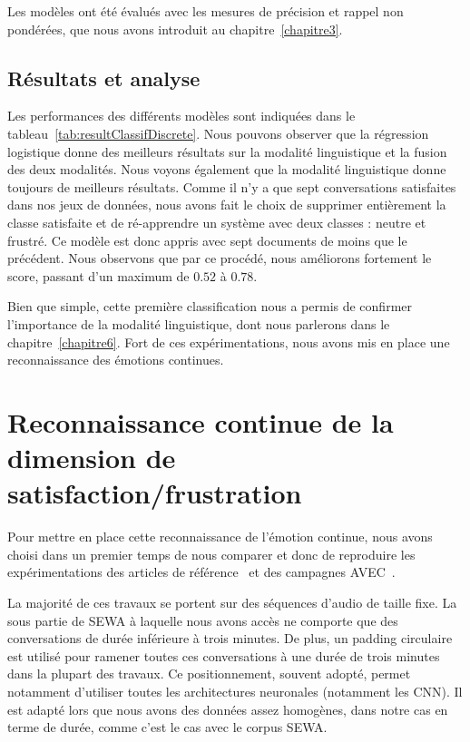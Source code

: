 Les modèles ont été évalués avec les mesures de précision et rappel non pondérées, que nous avons introduit au chapitre~\ref{chapitre3}.

\subsection{Résultats et analyse}



Les  performances des différents modèles sont indiquées dans le tableau~\ref{tab:resultClassifDiscrete}. Nous pouvons observer que la régression logistique donne des meilleurs résultats sur la modalité linguistique et la fusion des deux modalités. Nous voyons également que la modalité linguistique donne toujours de meilleurs résultats. Comme il n'y a que sept conversations satisfaites dans nos jeux de données, nous avons fait le choix de supprimer entièrement la classe satisfaite et de ré-apprendre un système avec deux classes : neutre et frustré. Ce modèle est donc appris avec sept documents de moins que le précédent. Nous observons que par ce procédé, nous améliorons fortement le score, passant d'un maximum de $0.52$ à $0.78$.

Bien que simple, cette première classification nous a permis de confirmer l'importance de la modalité linguistique, dont nous parlerons dans le chapitre~\ref{chapitre6}. Fort de ces expérimentations, nous avons mis en place une reconnaissance des émotions continues.

\section{Reconnaissance continue de la dimension de satisfaction/frustration}
Pour mettre en place cette reconnaissance de l'émotion continue, nous avons choisi dans un premier temps de nous comparer et donc de reproduire les expérimentations des articles de référence~\cite{Schmitt2019,SEWA} et des campagnes AVEC~\cite{AVEC2017,AVEC2018,AVEC2019}.

La majorité de ces travaux se portent sur des séquences d'audio de taille fixe. La sous partie de SEWA à laquelle nous avons accès ne comporte que des conversations de durée inférieure à trois minutes. De plus, un padding circulaire est utilisé pour ramener toutes ces conversations à une durée de trois minutes dans la plupart des travaux. Ce positionnement, souvent adopté, permet notamment d'utiliser toutes les architectures neuronales (notamment les CNN). Il est adapté lors que nous avons des données assez homogènes, dans notre cas en terme de durée, comme c'est le cas avec le corpus SEWA.

